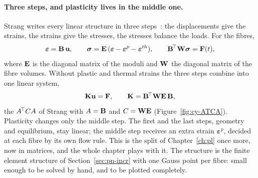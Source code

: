 \paragraph{Three steps, and plasticity lives in the middle one.}
%
Strang writes every linear structure in three steps~\cite{Strang1986c}: the
displacements give the strains, the strains give the stresses, the stresses
balance the loads. For the fibres,
\begin{equation}\label{eq:cy-discrete}
  \boldsymbol\varepsilon=\mathbf{B}\,\mathbf{u},\qquad
  \boldsymbol\sigma=\mathbf{E}\,(\boldsymbol\varepsilon-\boldsymbol\varepsilon^p-\boldsymbol\varepsilon^{th}),\qquad
  \mathbf{B}^{\!\top}\mathbf{W}\boldsymbol\sigma=\mathbf{F}(t),
\end{equation}
where $\mathbf{E}$ is the diagonal matrix of the moduli and $\mathbf{W}$ the
diagonal matrix of the fibre volumes. Without plastic and thermal strains the
three steps combine into one linear system,
\begin{equation}\label{eq:cy-K}
  \mathbf{K}\mathbf{u}=\mathbf{F},\qquad \mathbf{K}=\mathbf{B}^{\!\top}\mathbf{W}\mathbf{E}\,\mathbf{B},
\end{equation}
the $A^{\!\top} CA$ of Strang with $A=\mathbf{B}$ and $C=\mathbf{W}\mathbf{E}$
(Figure~\ref{fig:cy-ATCA}). Plasticity changes only the middle step. The first
and the last steps, geometry and equilibrium, stay linear; the middle step
receives an extra strain $\boldsymbol\varepsilon^p$, decided at each fibre by
its own flow rule. This is the split of Chapter~\ref{ch:pl} once more, now in
matrices, and the whole chapter plays with it. The structure is the finite
element structure of Section~\ref{sec:pn-incr} with one Gauss point per fibre:
small enough to be solved by hand, and to be plotted completely.

